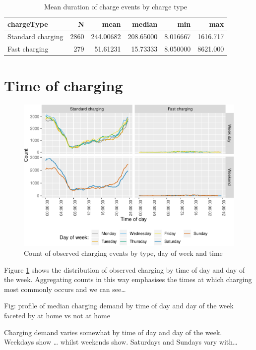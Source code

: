 \documentclass[]{article}
\begin{document}
\begin{table}[t]

\caption{\label{tab:meanDurationTable}Mean duration of charge events by charge type}
\centering
\begin{tabular}{l|r|r|r|r|r}
\hline
chargeType & N & mean & median & min & max\\
\hline
Standard charging & 2860 & 244.00682 & 208.65000 & 8.016667 & 1616.717\\
\hline
Fast charging & 279 & 51.61231 & 15.73333 & 8.050000 & 8621.000\\
\hline
\end{tabular}
\end{table}

\section{Time of charging}\label{time-of-charging}

\begin{figure}
\centering
\includegraphics{EVBB_report_files/figure-latex/chargeTime-1.pdf}
\caption{\label{fig:chargeTime}Count of observed charging events by type,
day of week and time}
\end{figure}

Figure \ref{fig:chargeTime} shows the distribution of observed charging
by time of day and day of the week. Aggregating counts in this way
emphasises the times at which charging most commonly occurs and we can
see\ldots{}

Fig: profile of median charging demand by time of day and day of the
week faceted by at home vs not at home

Charging demand varies somewhat by time of day and day of the week.
Weekdays show \ldots{} whilst weekends show. Saturdays and Sundays vary
with\ldots{}
\end{document}
